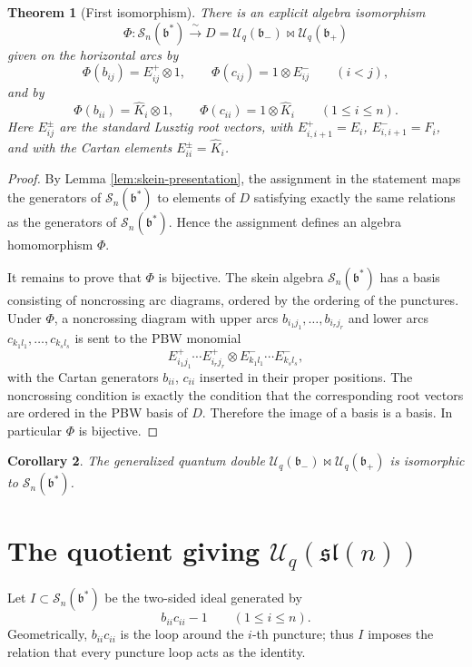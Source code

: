 \documentclass[11pt]{article}
\newcommand{\Uc}{\mathcal U}
\newcommand{\bcS}{\mathcal S}
\newcommand{\fb}{\mathfrak b}
\newcommand{\sl}{\mathfrak{sl}}
\newcommand{\bipr}{\bowtie}
\newtheorem{theorem}{Theorem}
\newtheorem{corollary}[theorem]{Corollary}
\theoremstyle{definition}
\theoremstyle{remark}
\begin{document}
\begin{theorem}[First isomorphism]\label{thm:first-iso}
There is an explicit algebra isomorphism
\[
\Phi:\bcS_n(\fb^*)\xrightarrow{\ \sim\ }D=\Uc_q(\fb_-)\bipr \Uc_q(\fb_+)
\]
given on the horizontal arcs by
\[
\Phi(b_{ij})=E_{ij}^+\otimes 1,\qquad
\Phi(c_{ij})=1\otimes E_{ij}^-\qquad (i<j),
\]
and by
\[
\Phi(b_{ii})=\hat K_i\otimes 1,\qquad
\Phi(c_{ii})=1\otimes \hat K_i\qquad (1\le i\le n).
\]
Here \(E_{ij}^\pm\) are the standard Lusztig root vectors, with
\(E_{i,i+1}^+=E_i\), \(E_{i,i+1}^-=F_i\), and with the Cartan elements
\(E_{ii}^\pm=\hat K_i\).
\end{theorem}

\begin{proof}
By Lemma \ref{lem:skein-presentation}, the assignment in the statement maps
the generators of \(\bcS_n(\fb^*)\) to elements of \(D\) satisfying exactly
the same relations as the generators of \(\bcS_n(\fb^*)\).  Hence the
assignment defines an algebra homomorphism \(\Phi\).

It remains to prove that \(\Phi\) is bijective.  The skein algebra
\(\bcS_n(\fb^*)\) has a basis consisting of noncrossing arc diagrams, ordered
by the ordering of the punctures.  Under \(\Phi\), a noncrossing diagram with
upper arcs \(b_{i_1j_1},\dots,b_{i_rj_r}\) and lower arcs
\(c_{k_1l_1},\dots,c_{k_sl_s}\) is sent to the PBW monomial
\[
E_{i_1j_1}^+\cdots E_{i_rj_r}^+ \otimes
E_{k_1l_1}^-\cdots E_{k_sl_s}^-,
\]
with the Cartan generators \(b_{ii}\), \(c_{ii}\) inserted in their proper
positions.  The noncrossing condition is exactly the condition that the
corresponding root vectors are ordered in the PBW basis of \(D\).  Therefore
the image of a basis is a basis.  In particular \(\Phi\) is bijective.
\end{proof}

\begin{corollary}\label{cor:first}
The generalized quantum double \(\Uc_q(\fb_-)\bipr \Uc_q(\fb_+)\) is
isomorphic to \(\bcS_n(\fb^*)\).
\end{corollary}

\section{The quotient giving \(\Uc_q(\sl(n))\)}

Let \(I\subset \bcS_n(\fb^*)\) be the two-sided ideal generated by
\[
b_{ii}c_{ii}-1\qquad (1\le i\le n).
\]
Geometrically, \(b_{ii}c_{ii}\) is the loop around the \(i\)-th puncture;
thus \(I\) imposes the relation that every puncture loop acts as the identity.
\end{document}
